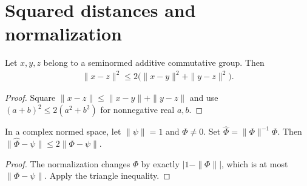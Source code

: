 \section{Squared distances and normalization}

\begin{lemma}
    \label{thm:norm_sub_squared_triangle}
    \leanok
    Let $x,y,z$ belong to a seminormed additive commutative group. Then
    \begin{align*}
        \|x-z\|^2\le2\bigl(\|x-y\|^2+\|y-z\|^2\bigr).
    \end{align*}
\end{lemma}
\begin{proof}
    \leanok
    Square $\|x-z\|\le\|x-y\|+\|y-z\|$ and use
    $(a+b)^2\le2(a^2+b^2)$ for nonnegative real $a,b$.
\end{proof}


\begin{lemma}
    \label{lem:unit_normalization_distance}
    \leanok
    In a complex normed space, let $\|\psi\|=1$ and $\Phi\ne0$.
    Set $\widehat\Phi=\|\Phi\|^{-1}\Phi$. Then
    $\|\widehat\Phi-\psi\|\le2\|\Phi-\psi\|$.
\end{lemma}
\begin{proof}\leanok
    The normalization changes $\Phi$ by exactly $|1-\|\Phi\||$,
    which is at most $\|\Phi-\psi\|$. Apply the triangle inequality.
\end{proof}
